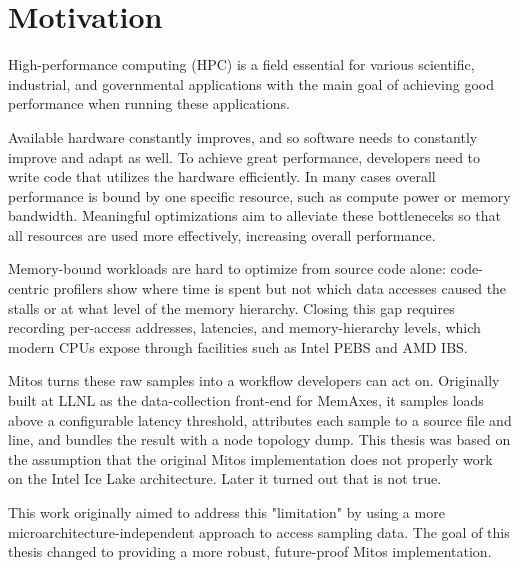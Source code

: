 \chapter{Motivation}\label{chap:motivation}

High-performance computing (HPC) is a field essential for various scientific, industrial, and governmental applications\cite{research-supercomputing-example,industry-supercomputing-example,ecp-AD-report} with the main goal of achieving good performance when running these applications.

Available hardware constantly improves, and so software needs to constantly improve and adapt as well. To achieve great performance, developers need to write code that utilizes the hardware efficiently. In many cases overall performance is bound by one specific resource, such as compute power or memory bandwidth. Meaningful optimizations aim to alleviate these bottleneceks so that all resources are used more effectively, increasing overall performance.\cite{Vecchio2022}

Memory-bound workloads are hard to optimize from source code alone: code-centric profilers show where time is spent but not which data accesses caused the stalls or at what level of the memory hierarchy. Closing this gap requires recording per-access addresses, latencies, and memory-hierarchy levels, which modern CPUs expose through facilities such as Intel PEBS and AMD IBS\cite{IntelManual,AMDManual}.

Mitos\cite{mitosGh} turns these raw samples into a workflow developers can act on. Originally built at LLNL as the data-collection front-end for MemAxes\cite{memaxes}, it samples loads above a configurable latency threshold, attributes each sample to a source file and line, and bundles the result with a node topology dump. This thesis was based on the assumption that the original Mitos implementation does not properly work on the Intel Ice Lake architecture. Later it turned out that is not true.

This work originally aimed to address this "limitation" by using a more microarchitecture-independent approach to access sampling data. The goal of this thesis changed to providing a more robust, future-proof Mitos implementation.